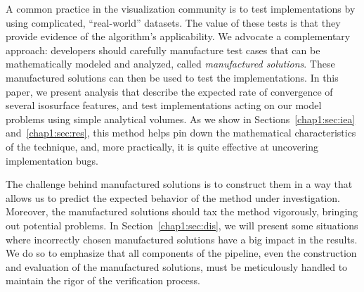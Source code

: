 A common practice in the visualization community is to test
implementations by using complicated, ``real-world'' datasets. The
value of these tests is that they provide evidence of the algorithm's applicability. We
advocate a complementary approach: developers should carefully
manufacture test cases that can be mathematically modeled and
analyzed, called \emph{manufactured solutions}. These manufactured
solutions can then be used to test the implementations. In this paper, we present
analysis that describe the expected rate of convergence of several
isosurface features, and test implementations acting on our model problems
using simple analytical volumes. As we show in Sections~\ref{chap1:sec:iea} 
and~\ref{chap1:sec:res}, this method helps pin down the mathematical characteristics 
of the technique, and, more practically, it is quite effective at uncovering 
implementation bugs.



The challenge behind manufactured solutions is to construct them in a
way that allows us to predict the expected behavior of the method
under investigation.  Moreover, the manufactured solutions should tax
the method vigorously, bringing out potential problems. In
Section~\ref{chap1:sec:dis}, we will present some situations where
incorrectly chosen manufactured solutions have a big impact in the
results.  We do so to emphasize that all components of the pipeline,
even the construction and evaluation of the manufactured solutions,
must be meticulously handled to maintain the rigor of the verification
process.


%

